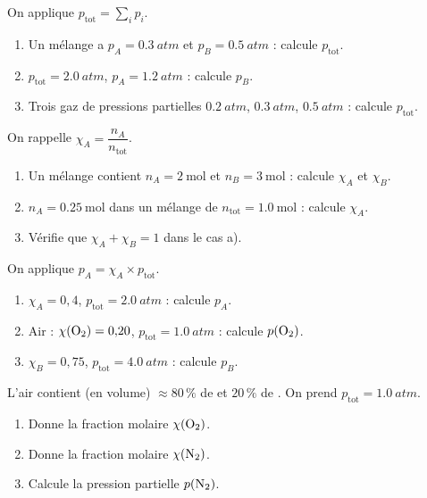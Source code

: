 \documentclass[11pt,a4paper]{article}
\begin{document}
\begin{exo}[pression totale = somme des partielles]
On applique $p_{\text{tot}}=\sum_i p_i$.
\begin{enumerate}[label=\alph*)]
  \item Un mélange a $p_A=\qty{0.3}{atm}$ et $p_B=\qty{0.5}{atm}$ : calcule $p_{\text{tot}}$.
  \item $p_{\text{tot}}=\qty{2.0}{atm}$, $p_A=\qty{1.2}{atm}$ : calcule $p_B$.
  \item Trois gaz de pressions partielles $\qty{0.2}{atm}$, $\qty{0.3}{atm}$, $\qty{0.5}{atm}$ :
        calcule $p_{\text{tot}}$.
\end{enumerate}
\end{exo}

\begin{exo}
On rappelle $\chi_A=\dfrac{n_A}{n_{\text{tot}}}$.
\begin{enumerate}[label=\alph*)]
  \item Un mélange contient $n_A=\qty{2}{\mole}$ et $n_B=\qty{3}{\mole}$ : calcule $\chi_A$ et $\chi_B$.
  \item $n_A=\qty{0.25}{\mole}$ dans un mélange de $n_{\text{tot}}=\qty{1.0}{\mole}$ : calcule $\chi_A$.
  \item Vérifie que $\chi_A+\chi_B=1$ dans le cas a).
\end{enumerate}
\end{exo}

\begin{exo}
On applique $p_A=\chi_A\times p_{\text{tot}}$.
\begin{enumerate}[label=\alph*)]
  \item $\chi_A=0{,}4$, $p_{\text{tot}}=\qty{2.0}{atm}$ : calcule $p_A$.
  \item Air : $\chi(\ce{O2})=0{,}20$, $p_{\text{tot}}=\qty{1.0}{atm}$ : calcule $p(\ce{O2})$.
  \item $\chi_B=0{,}75$, $p_{\text{tot}}=\qty{4.0}{atm}$ : calcule $p_B$.
\end{enumerate}
\end{exo}

\begin{exo}[fraction volumique = fraction molaire]
L'air contient (en volume) $\approx 80\,\%$ de  et $20\,\%$ de . On prend
$p_{\text{tot}}=\qty{1.0}{atm}$.
\begin{enumerate}[label=\alph*)]
  \item Donne la fraction molaire $\chi(\ce{O2})$.
  \item Donne la fraction molaire $\chi(\ce{N2})$.
  \item Calcule la pression partielle $p(\ce{N2})$.
\end{enumerate}
\end{exo}
\end{document}
